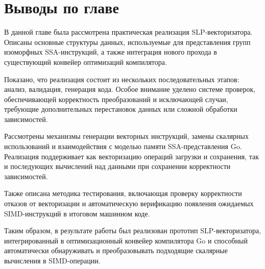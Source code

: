 \section*{Выводы по главе}

В данной главе была рассмотрена практическая реализация SLP-векторизатора. 
Описаны основные структуры данных, используемые для представления групп изоморфных SSA-инструкций, 
а также интеграция нового прохода в существующий конвейер оптимизаций компилятора.

Показано, что реализация состоит из нескольких последовательных этапов: анализ, валидация, генерация кода. 
Особое внимание уделено системе проверок, обеспечивающей корректность преобразований и исключающей случаи, 
требующие дополнительных перестановок данных или сложной обработки зависимостей.

Рассмотрены механизмы генерации векторных инструкций, замены скалярных использований и взаимодействия с моделью памяти SSA-представления Go. 
Реализация поддерживает как векторизацию операций загрузки и сохранения, так и последующих вычислений над данными при сохранении корректности зависимостей.

Также описана методика тестирования, включающая проверку корректности отказов от векторизации и автоматическую
верификацию появления ожидаемых SIMD-инструкций в итоговом машинном коде. 

Таким образом, в результате работы был реализован прототип SLP-векторизатора, интегрированный в оптимизационный конвейер 
компилятора Go и способный автоматически обнаруживать и преобразовывать подходящие скалярные вычисления в SIMD-операции.